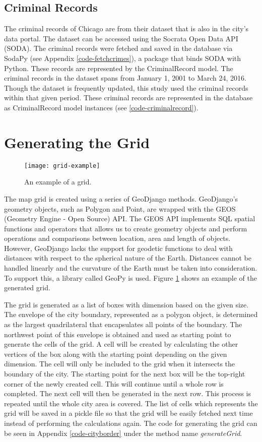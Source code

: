     \subsection{Criminal Records}
        The criminal records of Chicago are from their dataset that is also in the city's data portal. The dataset can be accessed using the Socrata Open Data API (SODA). The criminal records were fetched and saved in the database via SodaPy (see Appendix \ref{code-fetchcrimes}), a package that binds SODA with Python. These records are represented by the CriminalRecord model. The criminal records in the dataset spans from January 1, 2001 to March 24, 2016. Though the dataset is frequently updated, this study used the criminal records within that given period. These criminal records are represented in the database as CriminalRecord model instances (see \ref{code-criminalrecord}).

\section{Generating the Grid}
    \begin{figure}[H]
    \centering
    \texttt{[image: grid-example]}
    \caption{An example of a grid.}
    \label{fig:grid}
    \end{figure}
    The map grid is created using a series of GeoDjango methods. GeoDjango's geometry objects, such as Polygon and Point, are wrapped with the GEOS (Geometry Engine - Open Source) API. The GEOS API implements SQL spatial functions and operators that allows us to create geometry objects and perform operations and comparisons between location, area and length of objects. However, GeoDjango lacks the support for geodetic functions to deal with distances with respect to the spherical nature of the Earth. Distances cannot be handled linearly and the curvature of the Earth must be taken into consideration. To support this, a library called GeoPy is used. Figure \ref{fig:grid} shows an example of the generated grid.

    The grid is generated as a list of boxes with dimension based on the given size. The envelope of the city boundary, represented as a polygon object, is determined as the largest quadrilateral that encapsulates all points of the boundary. The northwest point of this envelope is obtained and used as starting point to generate the cells of the grid. A cell will be created by calculating the other vertices of the box along with the starting point depending on the given dimension. The cell will only be included to the grid when it intersects the boundary of the city. The starting point for the next box will be the top-right corner of the newly created cell. This will continue until a whole row is completed. The next cell will then be generated in the next row. This process is repeated until the whole city area is covered. The list of cells which represents the grid will be saved in a pickle file so that the grid will be easily fetched next time instead of performing the calculations again. The code for generating the grid can be seen in Appendix \ref{code-cityborder} under the method name \textit{generateGrid}.


